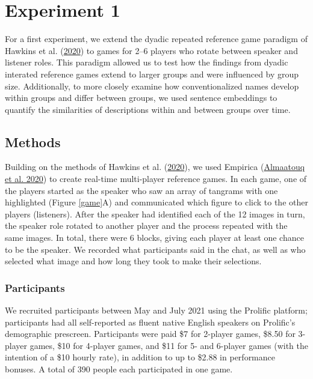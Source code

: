 \documentclass[
  english,
  a4paper,
]{article}
\begin{document}
\hypertarget{experiment-1}{%
\section{Experiment 1}\label{experiment-1}}

For a first experiment, we extend the dyadic repeated reference game paradigm of Hawkins et al. (\protect\hyperlink{ref-hawkinsCharacterizingDynamicsLearning2020}{2020}) to games for 2--6 players who rotate between speaker and listener roles. This paradigm allowed us to test how the findings from dyadic interated reference games extend to larger groups and were influenced by group size. Additionally, to more closely examine how conventionalized names develop within groups and differ between groups, we used sentence embeddings to quantify the similarities of descriptions within and between groups over time.

\hypertarget{methods}{%
\subsection{Methods}\label{methods}}

Building on the methods of Hawkins et al. (\protect\hyperlink{ref-hawkinsCharacterizingDynamicsLearning2020}{2020}), we used Empirica (\protect\hyperlink{ref-almaatouqEmpiricaVirtualLab2020}{Almaatouq et al. 2020}) to create real-time multi-player reference games. In each game, one of the players started as the speaker who saw an array of tangrams with one highlighted (Figure \ref{game}A) and communicated which figure to click to the other players (listeners). After the speaker had identified each of the 12 images in turn, the speaker role rotated to another player and the process repeated with the same images. In total, there were 6 blocks, giving each player at least one chance to be the speaker. We recorded what participants said in the chat, as well as who selected what image and how long they took to make their selections.

\hypertarget{participants}{%
\subsubsection{Participants}\label{participants}}

We recruited participants between May and July 2021 using the Prolific platform; participants had all self-reported as fluent native English speakers on Prolific's demographic prescreen. Participants were paid \$7 for 2-player games, \$8.50 for 3-player games, \$10 for 4-player games, and \$11 for 5- and 6-player games (with the intention of a \$10 hourly rate), in addition to up to \$2.88 in performance bonuses. A total of 390 people each participated in one game.
\end{document}
